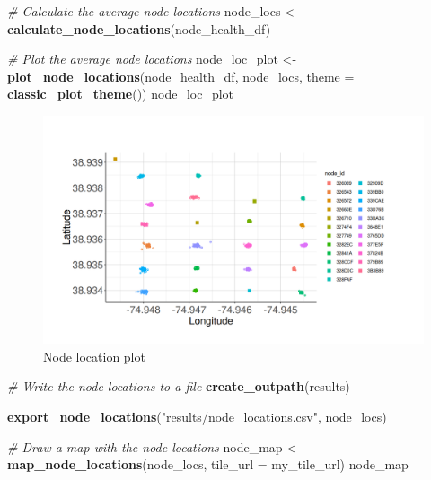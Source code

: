 \documentclass[
]{book}
\newenvironment{Shaded}{\begin{snugshade}}{\end{snugshade}}
\newcommand{\AttributeTok}[1]{\textcolor[rgb]{0.13,0.29,0.53}{#1}}
\newcommand{\CommentTok}[1]{\textcolor[rgb]{0.56,0.35,0.01}{\textit{#1}}}
\newcommand{\FunctionTok}[1]{\textcolor[rgb]{0.13,0.29,0.53}{\textbf{#1}}}
\newcommand{\NormalTok}[1]{#1}
\newcommand{\OtherTok}[1]{\textcolor[rgb]{0.56,0.35,0.01}{#1}}
\newcommand{\StringTok}[1]{\textcolor[rgb]{0.31,0.60,0.02}{#1}}
\begin{document}
\begin{Shaded}
\begin{Highlighting}[]
\CommentTok{\# Calculate the average node locations}
\NormalTok{node\_locs }\OtherTok{\textless{}{-}} \FunctionTok{calculate\_node\_locations}\NormalTok{(node\_health\_df)}

\CommentTok{\# Plot the average node locations}
\NormalTok{node\_loc\_plot }\OtherTok{\textless{}{-}} \FunctionTok{plot\_node\_locations}\NormalTok{(node\_health\_df, }
\NormalTok{                                     node\_locs,}
                                     \AttributeTok{theme =} \FunctionTok{classic\_plot\_theme}\NormalTok{())}
\NormalTok{node\_loc\_plot}
\end{Highlighting}
\end{Shaded}

\begin{figure}
\centering
\includegraphics{images/node_calibration_2.4_node_loc_plot.png}
\caption{Node location plot}
\end{figure}

\begin{Shaded}
\begin{Highlighting}[]
\CommentTok{\# Write the node locations to a file}
\FunctionTok{create\_outpath}\NormalTok{(}\StringTok{\textquotesingle{}results\textquotesingle{}}\NormalTok{)}

\FunctionTok{export\_node\_locations}\NormalTok{(}\StringTok{"results/node\_locations.csv"}\NormalTok{, }
\NormalTok{                      node\_locs)}

\CommentTok{\# Draw a map with the node locations}
\NormalTok{node\_map }\OtherTok{\textless{}{-}} \FunctionTok{map\_node\_locations}\NormalTok{(node\_locs, }
                               \AttributeTok{tile\_url =}\NormalTok{ my\_tile\_url)}
\NormalTok{node\_map}
\end{Highlighting}
\end{Shaded}
\end{document}
